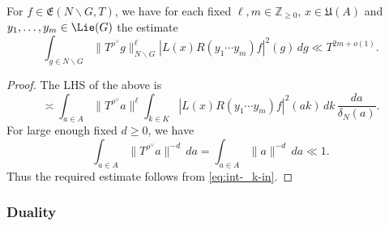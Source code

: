 \begin{lemma}\label{lem:f-in-mathfraken-square-integral-frakE}
  For $f \in \mathfrak{E}(N \backslash G, T)$, we have for each fixed $\ell,m \in \mathbb{Z}_{\geq 0}$, $x \in \mathfrak{U}(A)$ and $y_1,\dotsc,y_m \in \Lie(G)$ the estimate
  \begin{equation*}
    \int_{g \in N \backslash G } \|T^{\rho^\vee} g\|_{N \backslash G}^{\ell}
    \left\lvert L(x) R(y_1 \dotsb y_m) f \right\rvert^2(g) \, d g
    \ll
    T^{2 m + o(1)}.
  \end{equation*}
\end{lemma}
\begin{proof}
  The LHS of the above is
  \begin{equation*}
    \asymp
    \int_{a \in A}
    \|T^{\rho^\vee} a\|^{\ell}
    \int_{k \in K}
    \left\lvert L(x) R(y_1 \dotsb y_m) f \right\rvert^2(a k)
    \, d k
    \, \frac{d a}{ \delta_N(a)}.
  \end{equation*}
  For large enough fixed $d \geq 0$, we have
  \begin{equation*}
    \int_{a \in A} \|T^{\rho^\vee} a\|^{-d} \, d a
    =
    \int_{a \in A} \|a\|^{-d} \, d a
    \ll 1.
  \end{equation*}
  Thus the required estimate follows from \eqref{eq:int-_k-in}.
\end{proof}


\subsubsection{Duality}\label{sec:duality}

